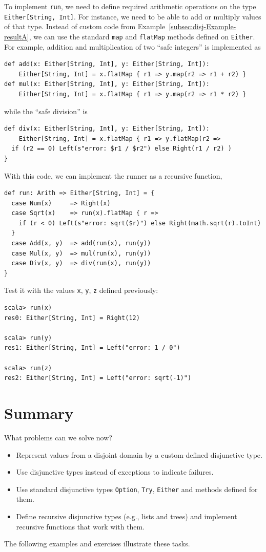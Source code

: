 To implement \lstinline!run!, we need to define required arithmetic
operations on the type \lstinline!Either[String, Int]!. For instance,
we need to be able to add or multiply values of that type. Instead
of custom code from Example~\ref{subsec:disj-Example-resultA}, we
can use the standard \lstinline!map! and \lstinline!flatMap! methods
defined on \lstinline!Either!. For example, addition and multiplication
of two \textsf{``}safe integers\textsf{''} is implemented as 
\begin{lstlisting}
def add(x: Either[String, Int], y: Either[String, Int]):
    Either[String, Int] = x.flatMap { r1 => y.map(r2 => r1 + r2) }
def mul(x: Either[String, Int], y: Either[String, Int]):
    Either[String, Int] = x.flatMap { r1 => y.map(r2 => r1 * r2) }
\end{lstlisting}
while the \textsf{``}safe division\textsf{''} is
\begin{lstlisting}
def div(x: Either[String, Int], y: Either[String, Int]):
    Either[String, Int] = x.flatMap { r1 => y.flatMap(r2 =>
  if (r2 == 0) Left(s"error: $r1 / $r2") else Right(r1 / r2) )
}
\end{lstlisting}
With this code, we can implement the runner as a recursive function,
\begin{lstlisting}
def run: Arith => Either[String, Int] = {
  case Num(x)     => Right(x)
  case Sqrt(x)    => run(x).flatMap { r =>
    if (r < 0) Left(s"error: sqrt($r)") else Right(math.sqrt(r).toInt)
  }
  case Add(x, y)  => add(run(x), run(y))
  case Mul(x, y)  => mul(run(x), run(y))
  case Div(x, y)  => div(run(x), run(y))
}
\end{lstlisting}
Test it with the values \lstinline!x!, \lstinline!y!, \lstinline!z!
defined previously:
\begin{lstlisting}
scala> run(x)
res0: Either[String, Int] = Right(12)

scala> run(y)
res1: Either[String, Int] = Left("error: 1 / 0")

scala> run(z)
res2: Either[String, Int] = Left("error: sqrt(-1)")
\end{lstlisting}


\section{Summary}

What problems can we solve now?
\begin{itemize}
\item Represent values from a disjoint domain by a custom-defined disjunctive
type.
\item Use disjunctive types instead of exceptions to indicate failures.
\item Use standard disjunctive types \lstinline!Option!, \lstinline!Try!,
\lstinline!Either! and methods defined for them.
\item Define recursive disjunctive types (e.g., lists and trees) and implement
recursive functions that work with them.
\end{itemize}
The following examples and exercises illustrate these tasks.


